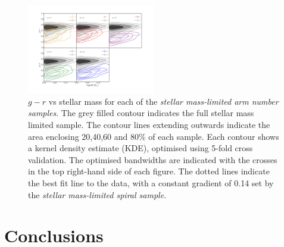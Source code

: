 \documentclass[useAMS,usenatbib]{mn2e}
\begin{document}
\begin{figure}
		\centering

        \includegraphics[width=0.5\textwidth]{Results_imgs/colour_mass_1.pdf}

        \caption{$g-r$ vs stellar mass for each of the \textit{stellar mass-limited arm number samples}. The grey filled contour indicates the full stellar mass limited sample. The contour lines extending outwards indicate the area enclosing 20,40,60 and 80\% of each sample. Each contour shows a kernel density estimate (KDE), optimised using 5-fold cross validation. The optimised bandwidths are indicated with the crosses in the top right-hand side of each figure. The dotted lines indicate the best fit line to the data, with a constant gradient of 0.14 set by the \textit{stellar mass-limited spiral sample}.}

        \label{fig:cm1}

\end{figure}
\section{Conclusions}
\label{sec:conclusions}
\end{document}

